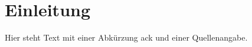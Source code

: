 
\section{Einleitung}
\label{sec:intro}
Hier steht Text mit einer Abkürzung \gls{ack} und einer Quellenangabe. \supercite{bosch:cantiming}